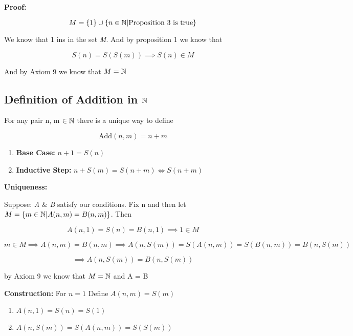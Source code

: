 \textbf{Proof:}

\[
	M = \{1\} \cup\{n \in \mathbb{N} | \text{Proposition 3 is true}\}
\]

We know that 1 ins in the set \emph{M}. And by proposition 1 we know that

\[
	S(n) = S(S(m)) \implies S(n) \in M
\]

And by Axiom 9 we know that \(M = \mathbb{N}\)

\subsection{Definition of Addition in \texorpdfstring{\(\mathbb{N}\)}{}}

For any pair n, m \(\in \mathbb{N}\) there is a unique way to define

\[
	\text{Add}(n , m) = n + m
\]

\begin{enumerate}
	
	\item \textbf{Base Case:} \(n + 1 = S(n)\)

	\item \textbf{Inductive Step:} \(n + S(m) = S(n + m) \iff S(n + m)\)

\end{enumerate}

\textbf{Uniqueness:} 
\vspace{\baselineskip}

Suppose: \textit{A} \& \textit{B} satisfy our conditions. Fix n and then let \(M = \{ m \in \mathbb{N} | 
A(n,m) = B(n, m)\}\). Then

\[
	A(n,1) = S(n) = B(n,1) \implies 1 \in M
\]

\[
	m \in M \implies A(n, m) = B(n, m) \implies A(n, S(m)) = S(A(n, m)) = S(B(n, m)) = B(n, S(m))
\]

\[
	\implies A(n , S(m)) = B(n, S(m))
\]

by Axiom 9 we know that \(M = \mathbb{N}\) and A = B

\textbf{Construction:} For \(n = 1\) Define \(A(n, m) = S(m)\)

\begin{enumerate}
	
	\item \(A(n, 1) = S(n) = S(1)\)
	
	\item \(A(n, S(m)) = S(A(n, m)) = S(S(m))\)

\end{enumerate}

